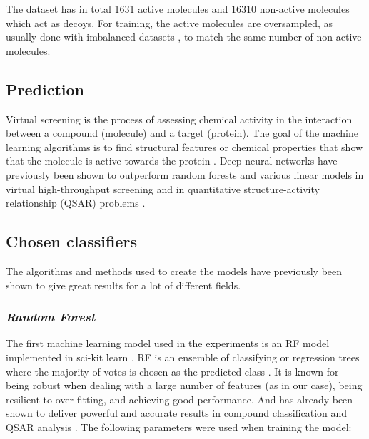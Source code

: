 \documentclass[\ifafour a4paper,12pt,\else a5paper,10pt,\fi%
onecolumn,oneside,article,%
british%
]{memoir}
\theoremstyle{remark}
\theoremstyle{innote}
\renewcommand*{\|}[1][]{\nonscript\:#1\vert\nonscript\:\mathopen{}}
\begin{document}
The dataset has in total 1631 active molecules and 16310 non-active molecules which act as decoys. For training, the active molecules are oversampled, as usually done with imbalanced datasets \autocites{provost2000}, to match the same number of non-active molecules.

\subsection{Prediction}

Virtual screening is the process of assessing chemical activity in the interaction between a compound (molecule) and a target (protein). The goal of the machine learning algorithms is to find structural features or chemical properties that show that the molecule is active towards the protein \autocites{green2019}. Deep neural networks have previously been shown to outperform random forests and various linear models in virtual high-throughput screening and in quantitative structure-activity relationship (QSAR) problems \autocite{koutsoukasetal2017}.
  
\subsection{Chosen classifiers} 

The algorithms and methods used to create the models have previously been shown to give great results for a lot of different fields.

\subsubsection{\textit{Random Forest}}

The first machine learning model used in the experiments is an RF model implemented in sci-kit learn \autocites{pedregosaetal2011}. RF is an ensemble of classifying or regression trees where the majority of votes is chosen as the predicted class \autocites{breiman2001b}. It is known for being robust when dealing with a large number of features (as in our case), being resilient to over-fitting, and achieving good performance. And has already been shown to deliver powerful and accurate results in compound classification and QSAR analysis \autocites{svetniketal2003}. The following parameters were used when training the model: 
\end{document}

